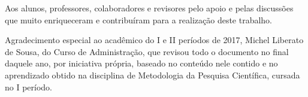 %

\begin{Agradecimentos}
Aos alunos, professores, colaboradores e revisores pelo apoio e pelas discussões que muito enriqueceram e contribuíram para a realização deste trabalho.

Agradecimento especial ao acadêmico do I e II períodos de 2017, Michel Liberato de Sousa, do Curso de Administração, que revisou todo o documento no final daquele ano, por iniciativa própria, baseado no conteúdo nele contido e no aprendizado obtido na disciplina de Metodologia da Pesquisa Científica, cursada no I período.
\end{Agradecimentos}